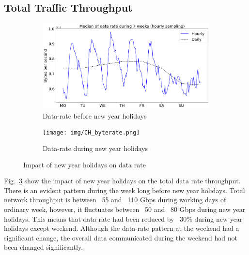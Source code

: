 \documentclass[10pt, journal, letterpaper]{IEEEtran}
\newcommand\linearFigSze{0.48}
\begin{document}
\subsection{Total Traffic Throughput}
\begin{figure}
    \begin{subfigure}{\linearFigSze\textwidth}
          \centering
          \includegraphics[width=\columnwidth]{img/BCH_byterate.png}
          \caption{Data-rate before new year holidays}
          \label{fig:BCH_bps}
    \end{subfigure}
    \begin{subfigure}{\linearFigSze\textwidth}
          \centering
          \texttt{[image: img/CH\_byterate.png]}
          \caption{Data-rate during new year holidays}
          \label{fig:CH_bps}
    \end{subfigure}
    \caption{Impact of new year holidays on data rate}
    \label{fig:datarate_BCH_CH}
\end{figure}
Fig.~\ref{fig:datarate_BCH_CH} show the impact of new year holidays on the total data rate throughput. There is an evident pattern during the week long before new year holidays. Total network throughput is between ~55 and ~110 Gbps during working days of ordinary week, however, it fluctuates between ~50 and ~80 Gbps during new year holidays. This means that data-rate had been reduced by ~30$\%$ during new year holidays except weekend. Although the data-rate pattern at the weekend had a significant change, the overall data communicated during the weekend had not been changed significantly.
\end{document}
